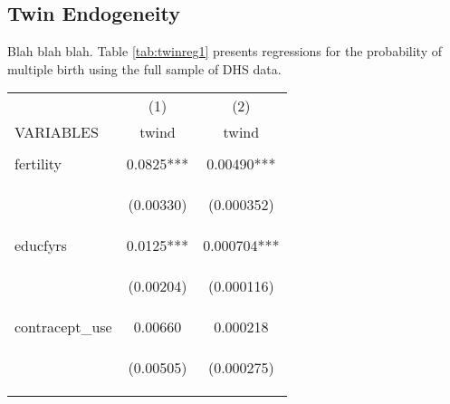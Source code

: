 \documentclass{article}[11pt,subeqn]
\begin{document}
\begin{spacing}{1.25}
\subsection{Twin Endogeneity}
\label{sec:twinendog}
Blah blah blah.  Table \ref{tab:twinreg1} presents regressions for the probability of multiple birth using the full sample of DHS data.\\
\begin{table}[ht]
\begin{center}
\begin{tabular}{lcc} \toprule
  & (1) & (2) \\
 VARIABLES & twind & twind \\ \midrule
 \begin{footnotesize}\end{footnotesize} & \begin{footnotesize}\end{footnotesize} & \begin{footnotesize}\end{footnotesize} \\
 fertility & 0.0825*** & 0.00490*** \\
  \begin{footnotesize}\end{footnotesize} & \begin{footnotesize}(0.00330)\end{footnotesize} & \begin{footnotesize}(0.000352)\end{footnotesize} \\
  educfyrs & 0.0125*** & 0.000704*** \\
  \begin{footnotesize}\end{footnotesize} & \begin{footnotesize}(0.00204)\end{footnotesize} & \begin{footnotesize}(0.000116)\end{footnotesize} \\
  contracept\_use & 0.00660 & 0.000218 \\
  \begin{footnotesize}\end{footnotesize} & \begin{footnotesize}(0.00505)\end{footnotesize} & \begin{footnotesize}(0.000275)\end{footnotesize} \\

\end{tabular}
\end{center}
\end{table}
\end{spacing}
\end{document}

